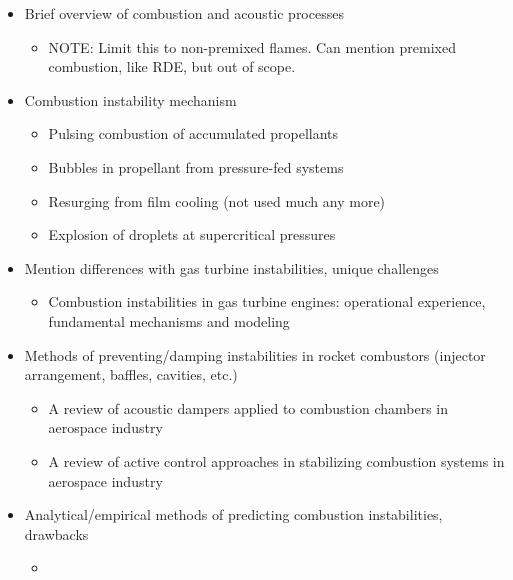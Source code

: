 \begin{itemize}
    \item Brief overview of combustion and acoustic processes
    \begin{itemize}
        \item NOTE: Limit this to non-premixed flames. Can mention premixed combustion, like RDE, but out of scope.
    \end{itemize}
    \item Combustion instability mechanism
    \begin{itemize}
        \item Pulsing combustion of accumulated propellants
        \item Bubbles in propellant from pressure-fed systems
        \item Resurging from film cooling (not used much any more)
        \item Explosion of droplets at supercritical pressures
    \end{itemize}
    \item Mention differences with gas turbine instabilities, unique challenges
    \begin{itemize}
        \item Combustion instabilities in gas turbine engines: operational experience, fundamental mechanisms and modeling~\cite{Lieuwen2005}
    \end{itemize}
    \item Methods of preventing/damping instabilities in rocket combustors (injector arrangement, baffles, cavities, etc.)
    \begin{itemize}
        \item A review of acoustic dampers applied to combustion chambers in aerospace industry~\cite{Zhao2015}
        \item A review of active control approaches in stabilizing combustion systems in aerospace industry~\cite{Zhao2018}
    \end{itemize}
    \item Analytical/empirical methods of predicting combustion instabilities, drawbacks
    \begin{itemize}
        \item
    \end{itemize}
\end{itemize}